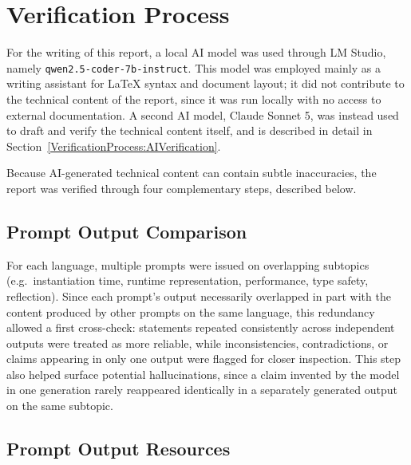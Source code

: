 \documentclass[11pt]{report}
\begin{document}
 

\clearpage

\tableofcontents
\clearpage

\chapter{Verification Process}
\label{Introduction}

For the writing of this report, a local AI model was used through LM Studio,
namely \texttt{qwen2.5-coder-7b-instruct}. This model was employed mainly as
a writing assistant for \LaTeX{} syntax and document layout;
it did not contribute to the technical content of the report, since it was
run locally with no access to external documentation. 
A second AI model, Claude Sonnet 5, was instead used to draft and
verify the technical content itself, and is described in detail in
Section~\ref{VerificationProcess:AIVerification}.

Because AI-generated technical content can contain subtle inaccuracies,
the report was verified through four complementary steps, described below.

\section{Prompt Output Comparison}
\label{VerificationProcess:PromptOutputComparison}

For each language, multiple prompts were issued on overlapping subtopics
(e.g.\ instantiation time, runtime representation, performance, type
safety, reflection). Since each prompt's output necessarily overlapped in
part with the content produced by other prompts on the same language, this
redundancy allowed a first cross-check: statements repeated consistently
across independent outputs were treated as more reliable, while
inconsistencies, contradictions, or claims appearing in only one output were
flagged for closer inspection. This step also helped surface potential
hallucinations, since a claim invented by the model in one generation rarely
reappeared identically in a separately generated output on the same
subtopic.

\section{Prompt Output Resources}
\label{VerificationProcess:PromptOutputResources}
\end{document}

